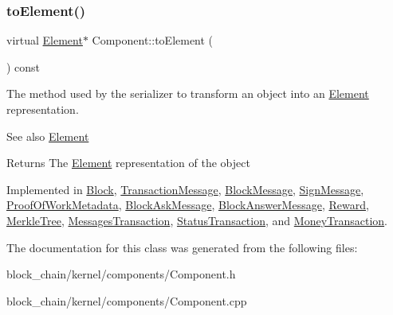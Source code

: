 \mbox{\label{classComponent_a3e63d8c993e417a4af3f56d65ebfc7ea}} 
\subsubsection{\texorpdfstring{to\+Element()}{toElement()}}
{\footnotesize\ttfamily virtual \mbox{\hyperlink{classElement}{Element}}$\ast$ Component\+::to\+Element (\begin{DoxyParamCaption}{ }\end{DoxyParamCaption}) const\hspace{0.3cm}{\ttfamily [pure virtual]}}

The method used by the serializer to transform an object into an \mbox{\hyperlink{classElement}{Element}} representation. \begin{DoxySeeAlso}{See also}
\mbox{\hyperlink{classElement}{Element}}
\end{DoxySeeAlso}
\begin{DoxyReturn}{Returns}
The \mbox{\hyperlink{classElement}{Element}} representation of the object 
\end{DoxyReturn}


Implemented in \mbox{\hyperlink{classBlock_aa289363a40f0d3ba88720ad0bc71f34f}{Block}}, \mbox{\hyperlink{classTransactionMessage_ae20e7d6a7b5811bb56a32ec6af59b8e2}{Transaction\+Message}}, \mbox{\hyperlink{classBlockMessage_ab47afd5cfb7d6d5c544d8def5d0f9737}{Block\+Message}}, \mbox{\hyperlink{classSignMessage_aee897c4bf78df966b8cca95e589566e4}{Sign\+Message}}, \mbox{\hyperlink{classProofOfWorkMetadata_a2aab4c26afb3a85a712cc065028274d9}{Proof\+Of\+Work\+Metadata}}, \mbox{\hyperlink{classBlockAskMessage_a0bc20076f19423855ab5772003fb65f6}{Block\+Ask\+Message}}, \mbox{\hyperlink{classBlockAnswerMessage_ac7f35ec9f7f2fbcd726628c2a984518b}{Block\+Answer\+Message}}, \mbox{\hyperlink{classReward_a0ecd536148463880f9980fe415b6eb1d}{Reward}}, \mbox{\hyperlink{classMerkleTree_a4e72819c6cbc49ed8ce092f464711a5f}{Merkle\+Tree}}, \mbox{\hyperlink{classMessagesTransaction_a0ef8ec080a2698a02ad8b1b95d243720}{Messages\+Transaction}}, \mbox{\hyperlink{classStatusTransaction_aed42f2d61f2d50ec07bb6b35473f61f2}{Status\+Transaction}}, and \mbox{\hyperlink{classMoneyTransaction_a84adc847266467965014cb04acd48bea}{Money\+Transaction}}.



The documentation for this class was generated from the following files\+:\begin{DoxyCompactItemize}
\item 
block\+\_\+chain/kernel/components/Component.\+h\item 
block\+\_\+chain/kernel/components/Component.\+cpp\end{DoxyCompactItemize}

